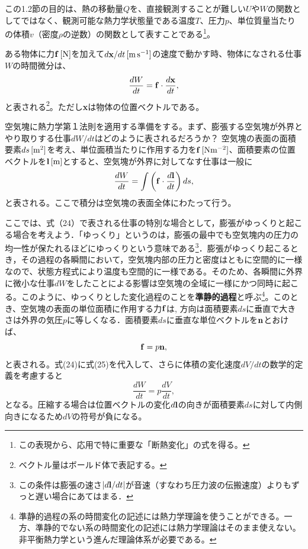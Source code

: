 \documentclass{jsarticle}
\begin{document}
この1.2節の目的は、熱の移動量$Q$を、直接観測することが難しい$U$や$W$の関数としてではなく、観測可能な熱力学状態量である温度$T$、圧力$p$、単位質量当たりの体積$v$（密度$\rho$の逆数）の関数として表すことである\footnote{この表現から、応用で特に重要な「断熱変化」の式を得る。}。

ある物体に力$\bf{f}\,[\rm{N}]$を加えて$d{\bf x}/dt\,[\rm{m\,s^{-1}}]$の速度で動かす時、物体になされる仕事$W$の時間微分は、
\begin{equation}
 \frac{dW}{dt}={\bf f}\cdot \frac{d{\bf x}}{dt},
\end{equation}
と表される\footnote{ベクトル量はボールド体で表記する。}。ただし{\bf x}は物体の位置ベクトルである。

空気塊に熱力学第１法則を適用する準備をする。まず、膨張する空気塊が外界とやり取りする仕事$dW/dt$はどのように表されるだろうか？
空気塊の表面の面積要素$ds\,[\rm{m^{2}}]$を考え、単位面積当たりに作用する力を${\bf f}\,[\rm{N m^{-2}}]$、面積要素の位置ベクトルを${\bf l}\,[\rm{m}]$とすると、空気塊が外界に対してなす仕事は一般に
\begin{equation}
 \frac{dW}{dt}=\int{\bigg (}{\bf f}\cdot \frac{d{\bf l}}{dt}{\bigg )}\,ds,
\end{equation}
と表される。ここで積分は空気塊の表面全体にわたって行う。

ここでは、式（24）で表される仕事の特別な場合として，膨張がゆっくりと起こる場合を考えよう．「ゆっくり」というのは，膨張の最中でも空気塊内の圧力の均一性が保たれるほどにゆっくりという意味である\footnote{この条件は膨張の速さ$| d{\bf l}/dt |$が音速（すなわち圧力波の伝搬速度）よりもずっと遅い場合にあてはまる．}．膨張がゆっくり起こるとき，その過程の各瞬間において，空気塊内部の圧力と密度はともに空間的に一様なので、状態方程式により温度も空間的に一様である。そのため、各瞬間に外界に微小な仕事$dW$をしたことによる影響は空気塊の全域に一様にかつ同時に起こる。このように、ゆっくりとした変化過程のことを{\bf 準静的過程}と呼ぶ\footnote{準静的過程の系の時間変化の記述には熱力学理論を使うことができる。一方、準静的でない系の時間変化の記述には熱力学理論はそのまま使えない。非平衡熱力学という進んだ理論体系が必要である。}。このとき、空気塊の表面の単位面積に作用する力${\bf f}$は, 方向は面積要素$ds$に垂直で大きさは外界の気圧$p$に等しくなる．面積要素$ds$に垂直な単位ベクトルを${\bf n}$とおけば、
\begin{equation}
 {\bf f}=p{\bf n},
\end{equation}
と表される。式(24)に式(25)を代入して、さらに体積の変化速度$dV/dt$の数学的定義を考慮すると
\begin{equation}
 \frac{dW}{dt}=p\frac{dV}{dt},
\end{equation}
となる。圧縮する場合は位置ベクトルの変化$d{\bf l}$の向きが面積要素$ds$に対して内側向きになるため$dV$の符号が負になる。
\end{document}
